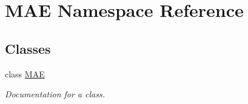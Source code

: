 \hypertarget{namespace_m_a_e}{}\section{M\+AE Namespace Reference}
\label{namespace_m_a_e}
\subsection*{Classes}
\begin{DoxyCompactItemize}
\item 
class \mbox{\hyperlink{class_m_a_e_1_1_m_a_e}{M\+AE}}
\begin{DoxyCompactList}\small\item\em Documentation for a class. \end{DoxyCompactList}\end{DoxyCompactItemize}
